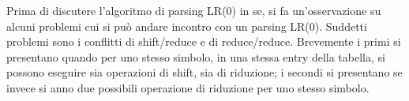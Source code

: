 \documentclass{subfiles}
\begin{document}
Prima di discutere l'algoritmo di parsing LR(0) in se, si fa un'osservazione su alcuni problemi cui si può andare incontro con un parsing LR(0).
Suddetti problemi sono i conflitti di shift/reduce e di reduce/reduce.
Brevemente i primi si presentano quando per uno stesso simbolo, in una stessa entry della tabella, si possono eseguire sia operazioni di shift, sia di riduzione;
i secondi si presentano se invece si anno due possibili operazione di riduzione per uno stesso simbolo.
\end{document}
